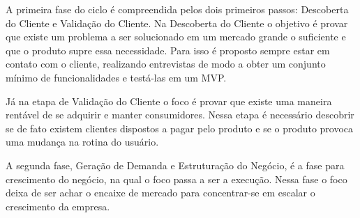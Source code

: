 \par A primeira fase do ciclo é compreendida pelos dois primeiros passos: Descoberta do Cliente e Validação do Cliente. Na Descoberta do Cliente o objetivo é provar que existe um problema a ser solucionado em um mercado grande o suficiente e que o produto supre essa necessidade. Para isso é proposto sempre estar em contato com o cliente, realizando entrevistas de modo a obter um conjunto mínimo de funcionalidades e testá-las em um MVP.
\par Já na etapa de Validação do Cliente o foco é provar que existe uma maneira rentável de se adquirir e manter consumidores. Nessa etapa é necessário descobrir se de fato existem clientes dispostos a pagar pelo produto e se o produto provoca uma mudança na rotina do usuário.
\par A segunda fase, Geração de Demanda e Estruturação do Negócio, é a fase para crescimento do negócio, na qual o foco passa a ser a execução. Nessa fase o foco deixa de ser achar o encaixe de mercado para concentrar-se em escalar o crescimento da empresa.
